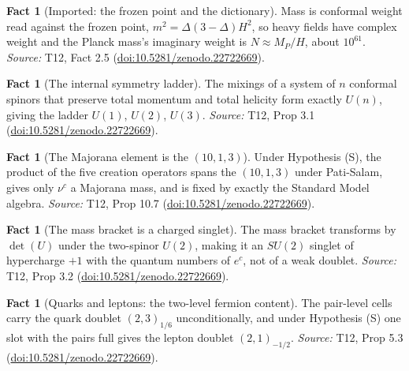 \documentclass[11pt]{article}
\theoremstyle{definition}
\newtheorem{fact}[theorem]{Fact}
\theoremstyle{plain}
\begin{document}
\begin{fact}[Imported: the frozen point and the dictionary]\label{c:standard-model.imported-frozen-point-dictionary}
Mass is conformal weight read against the frozen point, $m^{2} = \Delta(3-\Delta)H^{2}$, so heavy fields have complex weight and the Planck mass's imaginary weight is $N \approx M_{P}/H$, about $10^{61}$.
\emph{Source:} T12, Fact 2.5 (\href{https://doi.org/10.5281/zenodo.22722669}{doi:10.5281/zenodo.22722669}).
\end{fact}

\begin{fact}[The internal symmetry ladder]\label{c:standard-model.internal-symmetry-ladder}
The mixings of a system of $n$ conformal spinors that preserve total momentum and total helicity form exactly $U(n)$, giving the ladder $U(1)$, $U(2)$, $U(3)$.
\emph{Source:} T12, Prop 3.1 (\href{https://doi.org/10.5281/zenodo.22722669}{doi:10.5281/zenodo.22722669}).
\end{fact}

\begin{fact}[The Majorana element is the $(10,1,3)$]\label{c:standard-model.majorana-element}
Under Hypothesis (S), the product of the five creation operators spans the $(10,1,3)$ under Pati-Salam, gives only $\nu^{c}$ a Majorana mass, and is fixed by exactly the Standard Model algebra.
\emph{Source:} T12, Prop 10.7 (\href{https://doi.org/10.5281/zenodo.22722669}{doi:10.5281/zenodo.22722669}).
\end{fact}

\begin{fact}[The mass bracket is a charged singlet]\label{c:standard-model.mass-bracket-charged-singlet}
The mass bracket transforms by $\det(U)$ under the two-spinor $U(2)$, making it an $SU(2)$ singlet of hypercharge $+1$ with the quantum numbers of $e^{c}$, not of a weak doublet.
\emph{Source:} T12, Prop 3.2 (\href{https://doi.org/10.5281/zenodo.22722669}{doi:10.5281/zenodo.22722669}).
\end{fact}

\begin{fact}[Quarks and leptons: the two-level fermion content]\label{c:standard-model.quarks-leptons-two-level-fermion-content}
The pair-level cells carry the quark doublet $(2,3)_{1/6}$ unconditionally, and under Hypothesis (S) one slot with the pairs full gives the lepton doublet $(2,1)_{-1/2}$.
\emph{Source:} T12, Prop 5.3 (\href{https://doi.org/10.5281/zenodo.22722669}{doi:10.5281/zenodo.22722669}).
\end{fact}
\end{document}
